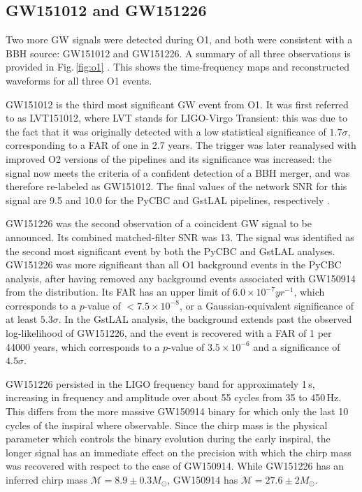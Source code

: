 \documentclass[binding=0.6cm, LaM]{sapthesis}
\begin{document}
\subsection{GW151012 and GW151226}
	Two more GW signals were detected during O1, and both were consistent with a BBH source: 
	GW151012 and GW151226.  
	A summary of all three observations is provided in Fig.\,\ref{fig:o1} \cite{13}.  
	This shows the time-frequency maps and reconstructed waveforms for all three O1 events.

	GW151012 is the third most significant GW event from O1.  
	It was first referred to as LVT151012, where LVT stands for LIGO-Virgo Transient: 
	this was due to the fact that it was originally detected with a low statistical significance of $1.7\sigma$, 
	corresponding to a FAR of one in 2.7 years.  
	The trigger was later reanalysed with improved O2 versions of the pipelines and its significance was increased: 
	the signal now meets the criteria of a confident detection of a BBH merger, 
	and was therefore re-labeled as GW151012.  
	The final values of the network SNR for this signal are 9.5 and 10.0 
	for the {\ttfamily PyCBC} and {\ttfamily GstLAL} pipelines, respectively \cite{13}.

	GW151226 was the second observation of a coincident GW signal to be announced. 
	Its combined matched-filter SNR was 13. 
	The signal was identified as the second most significant event by both the {\ttfamily PyCBC} and {\ttfamily GstLAL} analyses.
	GW151226 was more significant than all O1 background events in the {\ttfamily PyCBC} analysis, 
	after having removed any background events associated with GW150914 from the distribution.
	Its FAR has an upper limit of $6.0 \times 10^{-7} yr^{-1}$, which
        corresponds to a $p$-value of $< 7.5 \times 10^{-8}$, or a Gaussian-equivalent significance of at least $5.3\sigma$. 
	In the {\ttfamily GstLAL} analysis, the background extends past the observed log-likelihood of GW151226, 
	and the event is recovered with a FAR of 1 per 44000 years, which corresponds to a $p$-value of $3.5\times 10^{-6}$ and a significance of $4.5\sigma$.

	GW151226 persisted in the LIGO frequency band for approximately 1\,s, 
	increasing in frequency and amplitude over about 55 cycles from 35 to 450\,Hz. 
	This differs from the more massive GW150914 binary for which only the last 10 cycles of the inspiral where observable.  
	Since the chirp mass is the physical parameter which controls the binary evolution during the early inspiral, 
	the longer signal has an immediate effect on the precision 
	with which the chirp mass \cite{98,126} was recovered with respect to the case of GW150914.
	While GW151226 has an inferred chirp mass $\mathcal{M}=8.9\pm 0.3 M_\odot$,
	GW150914 has $\mathcal{M}=27.6\pm 2  M_\odot$.
\end{document}
